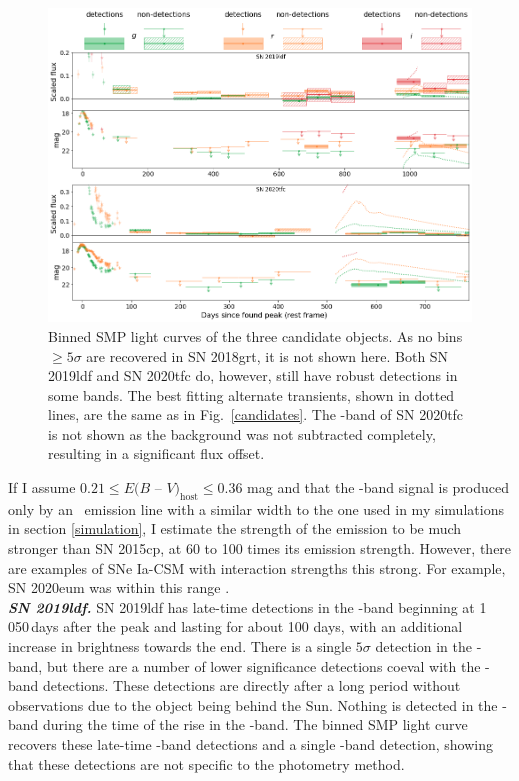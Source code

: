 \documentclass[a4paper,oneside,12pt, class=Latex/Classes/PhDthesisPSnPDF, crop=false]{standalone}
\begin{document}
\begin{figure}
 \centering
 \includegraphics[width=\textwidth]{../Images/chapter_3/candid_plots_smp.png}
 \caption{Binned SMP light curves of the three candidate objects. As no bins $\geq5\sigma$ are recovered in SN 2018grt, it is not shown here. Both SN 2019ldf and SN 2020tfc do, however, still have robust detections in some bands. The best fitting alternate transients, shown in dotted lines, are the same as in Fig.~\ref{candidates}. The \ztfi-band of SN 2020tfc is not shown as the background was not subtracted completely, resulting in a significant flux offset.}
 \label{final_candid_SMP}
\end{figure}

If I assume $0.21 \leq E(B$ -- $V)_\text{host} \leq 0.36$ mag and that the \ztfr-band signal is produced only by an \Halpha~emission line with a similar width to the one used in my simulations in section \ref{simulation}, I estimate the strength of the emission to be much stronger than SN 2015cp, at 60 to 100 times its emission strength. However, there are examples of SNe Ia-CSM with interaction strengths this strong. For example, SN 2020eum was within this range \citep{Ia-CSM_BTS}.\\


\textit{\textbf{SN 2019ldf.}}
SN 2019ldf has late-time detections in the \ztfr-band beginning at 1\,050\,days after the peak and lasting for about 100 days, with an additional increase in brightness towards the end. There is a single $5\sigma$ detection in the \ztfi-band, but there are a number of lower significance detections coeval with the \ztfr-band detections. These detections are directly after a long period without observations due to the object being behind the Sun. Nothing is detected in the \ztfg-band during the time of the rise in the \ztfr-band. The binned SMP light curve recovers these late-time \ztfr-band detections and a single \ztfi-band detection, showing that these detections are not specific to the photometry method.
\end{document}
